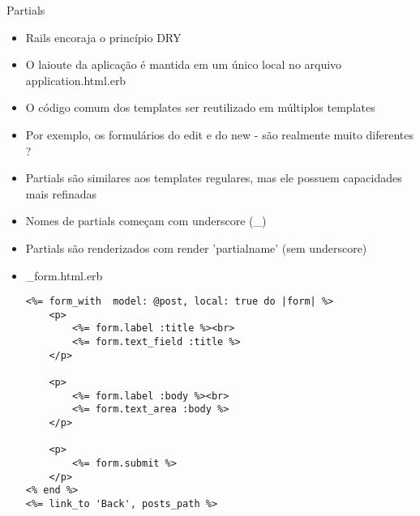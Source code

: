 \begin{frame}{Partials}
	\begin{itemize}
		\item Rails encoraja o princípio \alert{DRY}	
		\item O laioute da aplicação é mantida em um único local no arquivo \alert{application.html.erb}
		\item O código comum dos templates ser reutilizado em \alert{múltiplos templates}
		\item Por exemplo, os formulários do \alert{edit} e do \alert{new} - são realmente muito diferentes ?
		\item Partials são similares aos templates regulares, mas ele possuem capacidades mais \alert{refinadas}
		\item Nomes de partials começam com \alert{underscore} (\_) 
		\item Partials são renderizados com \alert{render 'partialname'} (sem underscore)
\framebreak
		\item \alert{\_form.html.erb}
		\begin{lstlisting}[style=RubyInputStyle, caption=views/posts/\_form.html.erb]
<%= form_with  model: @post, local: true do |form| %>
	<p>
		<%= form.label :title %><br>
		<%= form.text_field :title %>
	</p>
	
	<p>
		<%= form.label :body %><br>
		<%= form.text_area :body %>
	</p>
	
	<p>
		<%= form.submit %>
	</p>
<% end %>	
<%= link_to 'Back', posts_path %>
		\end{lstlisting}
	\end{itemize}	
\end{frame}


